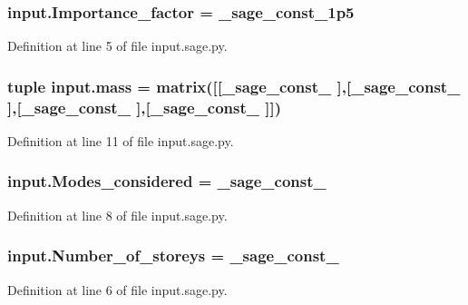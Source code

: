 \subsubsection[{Importance\+\_\+factor}]{\setlength{\rightskip}{0pt plus 5cm}input.\+Importance\+\_\+factor = \+\_\+sage\+\_\+const\+\_\+1p5}\label{namespaceinput_a0840d963ea24db338f3ab4457defb494}


Definition at line 5 of file input.\+sage.\+py.

\hypertarget{namespaceinput_af91e2c1a9ecd07a9c8dcf3a5fc8b2b60}{}
\subsubsection[{mass}]{\setlength{\rightskip}{0pt plus 5cm}tuple input.\+mass = matrix(\mbox{[}\mbox{[}\+\_\+sage\+\_\+const\+\_ \mbox{]},\mbox{[}\+\_\+sage\+\_\+const\+\_ \mbox{]},\mbox{[}\+\_\+sage\+\_\+const\+\_ \mbox{]},\mbox{[}\+\_\+sage\+\_\+const\+\_ \mbox{]}\mbox{]})}\label{namespaceinput_af91e2c1a9ecd07a9c8dcf3a5fc8b2b60}


Definition at line 11 of file input.\+sage.\+py.

\hypertarget{namespaceinput_adb7aca4735796aaa4a46456d3edeac2e}{}
\subsubsection[{Modes\+\_\+considered}]{\setlength{\rightskip}{0pt plus 5cm}input.\+Modes\+\_\+considered = \+\_\+sage\+\_\+const\+\_}\label{namespaceinput_adb7aca4735796aaa4a46456d3edeac2e}


Definition at line 8 of file input.\+sage.\+py.

\hypertarget{namespaceinput_a10237b312ba44e8c8090db86059c5803}{}
\subsubsection[{Number\+\_\+of\+\_\+storeys}]{\setlength{\rightskip}{0pt plus 5cm}input.\+Number\+\_\+of\+\_\+storeys = \+\_\+sage\+\_\+const\+\_}\label{namespaceinput_a10237b312ba44e8c8090db86059c5803}


Definition at line 6 of file input.\+sage.\+py.

